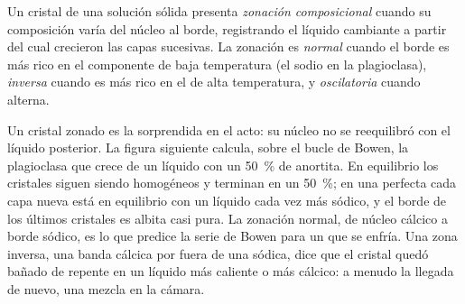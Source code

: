 \begin{definition}\label{def:b2:magmatic-differentiation:zoning}
Un cristal de una solución sólida presenta \emph{zonación composicional}
cuando su composición varía del núcleo al borde, registrando el líquido cambiante
a partir del cual crecieron las capas sucesivas. La zonación es \emph{normal} cuando el borde es más rico en
el componente de baja temperatura (el sodio en la plagioclasa), \emph{inversa} cuando es
más rico en el de alta temperatura, y \emph{oscilatoria} cuando alterna.
\end{definition}

Un cristal zonado es la  sorprendida en el acto: su núcleo no se
reequilibró con el líquido posterior. La figura siguiente calcula, sobre el bucle de Bowen,
la plagioclasa que crece de un líquido con un \qty{50}{\percent} de anortita. En
equilibrio los cristales siguen siendo homogéneos y terminan en un \qty{50}{\percent}; en una  perfecta cada capa nueva está en equilibrio con un líquido cada vez más sódico,
y el borde de los últimos cristales es albita casi pura. La zonación normal, de
núcleo cálcico a borde sódico, es lo que predice la serie de Bowen para un  que se enfría. Una zona
inversa, una banda cálcica por fuera de una sódica, dice que el cristal quedó bañado de repente en
un líquido más caliente o más cálcico: a menudo la llegada de  nuevo, una mezcla en la
cámara.

